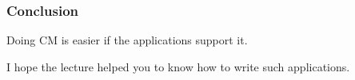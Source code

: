 \begin{frame}
	\frametitle{Conclusion}

	Doing CM is easier if the applications support it.
	\vspace{1cm}

	I hope the lecture helped you to know how to write such applications.
\end{frame}




\nocite{raab2017introducing}

\appendix

\begin{frame}[allowframebreaks]
	
	
\end{frame}



